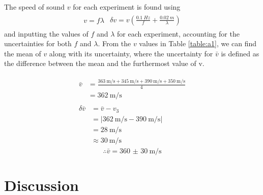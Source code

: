 \documentclass[letter]{article}
\numberwithin{equation}{section}
\numberwithin{figure}{section}
\numberwithin{table}{section}
\begin{document}
The speed of sound \(v\) for each experiment is found using
\begin{align} \label{eq:a4}
  \begin{split}
    v = f \lambda
  \end{split}
  \begin{split}
    \delta v = v \left(\frac{\SI{0.1}{Hz}}{f} + \frac{\SI{0.02}{m}}{\lambda} \right)
  \end{split}
\end{align}
and inputting the values of \(f\) and \(\lambda\) for each experiment, accounting for the uncertainties for both \(f\) and \(\lambda\). From the \(v\) values in Table \ref{table:a1}, we can find the mean of \(v\) along with its uncertainty, where the uncertainty for \(\bar{v}\) is defined as the difference between the mean and the furthermost value of v.

\begin{align*}
  \begin{split}
    \bar{v} &= \frac{\SI{363}{\metre\per\second} + \SI{345}{\metre\per\second} + \SI{390}{\metre\per\second} + \SI{350}{\metre\per\second}}{4} \\
    &= \SI{362}{\metre\per\second}
  \end{split} \\
  \begin{split}
    \delta \bar{v} &= \bar{v} - v_3 \\
    &= |\SI{362}{\metre\per\second} - \SI{390}{\metre\per\second}| \\
    &= \SI{28}{\metre\per\second} \\
    &\approx \SI{30}{\metre\per\second}
  \end{split}
\end{align*}
\[\therefore \bar{v} = \SI{360(30)}{\metre\per\second}\]

\section{Discussion}
\end{document}
